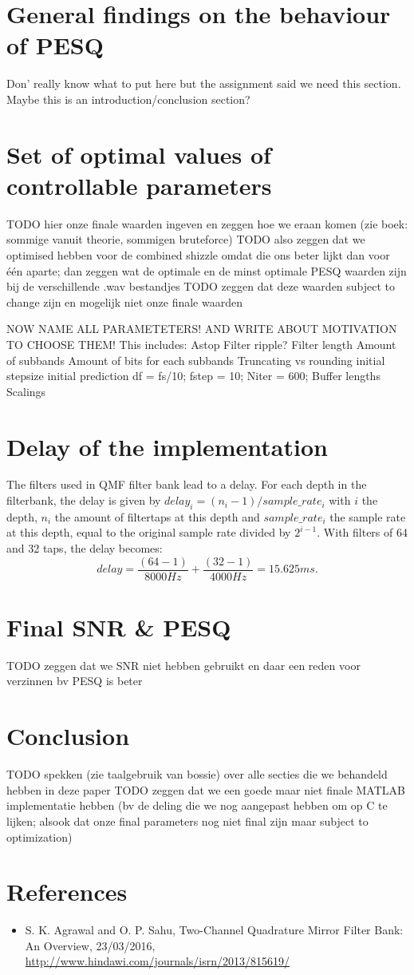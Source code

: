 \documentclass[a4paper]{article}
\begin{document}
\section{General findings on the behaviour of PESQ}
Don' really know what to put here but the assignment said we need this section. Maybe this is an introduction/conclusion section?

\section{Set of optimal values of controllable parameters}
TODO hier onze finale waarden ingeven en zeggen hoe we eraan komen (zie boek: sommige vanuit theorie, sommigen bruteforce)
TODO also zeggen dat we optimised hebben voor de combined shizzle omdat die ons beter lijkt dan voor één aparte; dan zeggen wat de optimale en de minst optimale PESQ waarden zijn bij de verschillende .wav bestandjes
TODO zeggen dat deze waarden subject to change zijn en mogelijk niet onze finale waarden

NOW NAME ALL PARAMETETERS! AND WRITE ABOUT MOTIVATION TO CHOOSE THEM! This includes:
Astop
Filter ripple?
Filter length
Amount of subbands
Amount of bits for each subbands
Truncating vs rounding
initial stepsize
initial prediction
df = fs/10;
fstep = 10;
Niter = 600;
Buffer lengths
Scalings

\section{Delay of the implementation}
The filters used in QMF filter bank lead to a delay. For each depth in the filterbank, the delay is given by $delay_i = (n_i-1) / sample\_rate_i$ with $i$ the depth, $n_i$ the amount of filtertaps at this depth and $sample\_rate_i$ the sample rate at this depth, equal to the original sample rate divided by $2^{i-1}$. With filters of 64 and 32 taps, the delay becomes:
\begin{equation*}
delay = \frac{(64-1)}{8000 Hz} + \frac{(32-1)}{4000 Hz} = 15.625 ms.
\end{equation*}

\section{Final SNR \& PESQ}
TODO zeggen dat we SNR niet hebben gebruikt en daar een reden voor verzinnen bv PESQ is beter

\section{Conclusion}
TODO spekken (zie taalgebruik van bossie) over alle secties die we behandeld hebben in deze paper
TODO zeggen dat we een goede maar niet finale MATLAB implementatie hebben (bv de deling die we nog aangepast hebben om op C te lijken; alsook dat onze final parameters nog niet final zijn maar subject to optimization)

\section{References}
\begin{itemize}
\item S. K. Agrawal and O. P. Sahu, Two-Channel Quadrature Mirror Filter Bank: An Overview, 23/03/2016, \url{http://www.hindawi.com/journals/isrn/2013/815619/}
\end{itemize}
\end{document}
